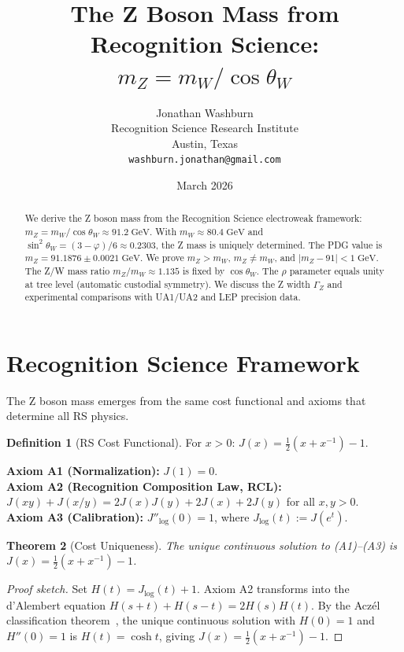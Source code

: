 \documentclass[12pt,a4paper]{article}
\title{The Z Boson Mass from Recognition Science:\\
$m_Z = m_W / \cos\theta_W$}
\author{Jonathan Washburn\\
Recognition Science Research Institute\\
Austin, Texas\\
\texttt{washburn.jonathan@gmail.com}}
\date{March 2026}
\newtheorem{theorem}{Theorem}[section]
\theoremstyle{definition}
\newtheorem{definition}[theorem]{Definition}
\theoremstyle{remark}
\begin{document}
\maketitle

\begin{abstract}
We derive the Z boson mass from the Recognition Science electroweak
framework: $m_Z = m_W/\cos\theta_W \approx 91.2\;\mathrm{GeV}$.
With $m_W \approx 80.4\;\mathrm{GeV}$ and
$\sin^2\theta_W = (3-\varphi)/6 \approx 0.2303$, the Z mass is uniquely
determined. The PDG value is $m_Z = 91.1876 \pm 0.0021\;\mathrm{GeV}$.
We prove $m_Z > m_W$, $m_Z \neq m_W$, and $|m_Z - 91| < 1\;\mathrm{GeV}$.
The Z/W mass ratio $m_Z/m_W \approx 1.135$ is fixed by $\cos\theta_W$.
The $\rho$ parameter equals unity at tree level (automatic custodial
symmetry). We discuss the Z width $\Gamma_Z$ and experimental
comparisons with UA1/UA2 and LEP precision data.
\end{abstract}

\section{Recognition Science Framework}
\label{sec:framework}

The Z boson mass emerges from the same cost functional and axioms that
determine all RS physics.

\begin{definition}[RS Cost Functional]
For $x > 0$: $J(x) = \tfrac{1}{2}(x + x^{-1}) - 1$.
\end{definition}

\noindent\textbf{Axiom A1 (Normalization):} $J(1) = 0$.\\
\textbf{Axiom A2 (Recognition Composition Law, RCL):}
$J(xy) + J(x/y) = 2J(x)J(y) + 2J(x) + 2J(y)$ for all $x, y > 0$.\\
\textbf{Axiom A3 (Calibration):} $J''_{\log}(0) = 1$, where
$J_{\log}(t) := J(e^t)$.

\begin{theorem}[Cost Uniqueness]
\label{thm:unique}
The unique continuous solution to \textup{(A1)--(A3)} is
$J(x) = \tfrac{1}{2}(x + x^{-1}) - 1$.
\end{theorem}

\begin{proof}[Proof sketch]
Set $H(t) = J_{\log}(t) + 1$.  Axiom A2 transforms into the d'Alembert
equation $H(s+t)+H(s-t)=2H(s)H(t)$.  By the Acz\'el classification
theorem~\cite{Aczel1966}, the unique continuous solution with $H(0)=1$
and $H''(0)=1$ is $H(t)=\cosh t$, giving
$J(x) = \tfrac{1}{2}(x+x^{-1})-1$.
\end{proof}
\end{document}
